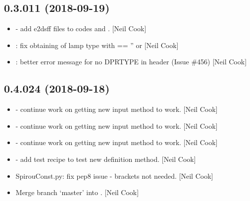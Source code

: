 \documentclass[a4paper,10pt,english]{report}
\begin{document}
\subsection{0.3.011 (2018-09-19)}
\label{\detokenize{misc/changelog:id320}}\begin{itemize}
\item {} 
 - add e2dsff files to  codes and .
{[}Neil Cook{]}

\item {} 
: fix obtaining of lamp type with 
 == ” or  {[}Neil Cook{]}

\item {} 
: better error message for no DPRTYPE in
header (Issue \#456) {[}Neil Cook{]}

\end{itemize}


\subsection{0.4.024 (2018-09-18)}
\label{\detokenize{misc/changelog:id321}}\begin{itemize}
\item {} 
 - continue work on getting new input method to work.
{[}Neil Cook{]}

\item {} 
 - continue work on getting new input method to work.
{[}Neil Cook{]}

\item {} 
 - continue work on getting new input method to work.
{[}Neil Cook{]}

\item {} 
 - add test recipe to test new definition method. {[}Neil
Cook{]}

\item {} 
SpirouConst.py: fix pep8 issue - brackets not needed. {[}Neil Cook{]}

\item {} 
Merge branch ‘master’ into . {[}Neil Cook{]}

\end{itemize}
\end{document}
